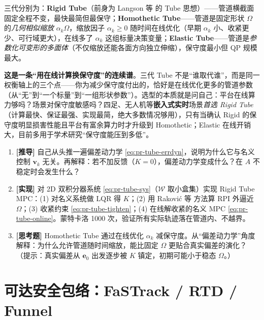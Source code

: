 三代分别为：\textbf{Rigid Tube}\cite{mayne2005tube}（前身为 Langson 等\cite{langson2004robust} 的 Tube 思想）——管道横截面固定全程不变，最快最简但最保守；\textbf{Homothetic Tube}\cite{rakovic2012homothetic}——管道是固定形状 $\Omega$ 的\emph{几何相似缩放} $\alpha_k\Omega$，缩放因子 $\alpha_k\ge0$ 随时间在线优化（早期 $\alpha_k$ 小、收紧更少、可行域更大），在线多了 $\alpha_k$ 这组标量决策变量；\textbf{Elastic Tube}\cite{rakovic2016elastic}——管道是\emph{参数化可变形的多面体}（不仅缩放还能各面方向独立伸缩），保守度最小但 QP 规模最大。

\begin{insight}
\textbf{这是一条“用在线计算换保守度”的连续谱}。三代 Tube 不是“谁取代谁”，而是同一权衡轴上的三个点——你为减少保守度付出的，恰好是在线优化更多的管道参数（从“无”到“一个标量”到“一组形状参数”）。选型的本质就是问自己：平台在线算力够吗？场景对保守度敏感吗？四足、无人机等\textbf{嵌入式实时}场景\emph{首选 Rigid Tube}（计算最快、保证最强、实现最简，绝大多数情况够用），只有当确认 Rigid 的保守度明显损害性能且平台有富余算力时才升级到 Homothetic；Elastic 在线开销大，目前多用于学术研究“保守度能压到多低”。
\end{insight}

\begin{practice}
\begin{enumerate}
  \item \textbf{[推导]} 自己从头推一遍偏差动力学 \cref{eq:pr-tube-errdyn}，说明为什么它与名义控制 $\mathbf{v}_k$ 无关。再解释：若不加反馈（$K=0$），偏差动力学变成什么？在 $A$ 不稳定时会发生什么？
  \item \textbf{[实现]} 对 2D 双积分器系统 \cref{eq:pr-tube-sys}（$\mathcal{W}$ 取小盒集）实现 Rigid Tube MPC：(1) 对名义系统做 LQR 得 $K$；(2) 用 Raković 等\cite{rakovic2005invariant} 方法算 RPI 外逼近 $\Omega$；(3) 收紧约束 \cref{eq:pr-tube-tighten}；(4) 在线解收紧的名义 MPC \cref{eq:pr-tube-online}。蒙特卡洛 1000 次，验证所有实际轨迹落在管道内、不越界。
  \item \textbf{[思考题]} Homothetic Tube 通过在线优化 $\alpha_k$ 减保守度。从“偏差动力学”角度解释：为什么允许管道随时间缩放，能比固定 $\Omega$ 更贴合真实偏差的演化？（提示：真实偏差从 $\mathbf{e}_0$ 出发逐步被 $K$ 镇定，初期可能小于稳态 $\Omega$。）
\end{enumerate}
\end{practice}

\section{可达安全包络：FaSTrack / RTD / Funnel}
\label{sec:pr-reach}

